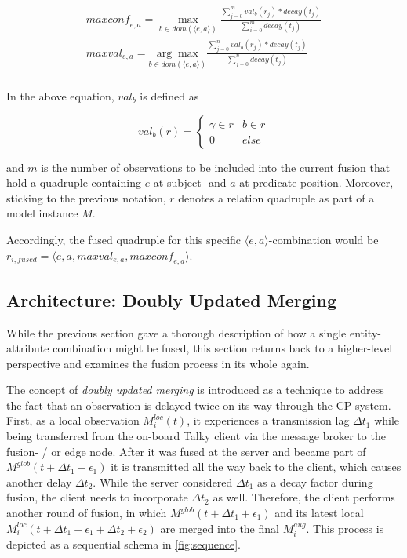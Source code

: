 \begin{gather*}
	\textit{maxconf}_{e,a} = \underset{b \in \textit{dom}(\langle e, a \rangle)}{\max} \frac{\sum_{j = 0}^{m} \textit{val}_b(r_j) * \textit{decay}(t_j)}{\sum_{i = 0}^{m} \textit{decay}(t_j)} \\\textit{maxval}_{e,a} = \underset{b \in \textit{dom}(\langle e, a \rangle)}{\arg\max} \frac{\sum_{j = 0}^{n} \textit{val}_b(r_j) * \textit{decay}(t_j)}{\sum_{j = 0}^{n} \textit{decay}(t_j)} \\
\end{gather*}

In the above equation, $\textit{val}_b$ is defined as

$$
\textit{val}_b(r) = 
	\begin{cases}
	\gamma \in r & b \in r \\
	0 & else
	\end{cases}
$$

and $m$ is the number of observations to be included into the current fusion that hold a quadruple containing $e$ at subject- and $a$ at predicate position. Moreover, sticking to the previous notation, $r$ denotes a relation quadruple as part of a model instance $M$.

Accordingly, the fused quadruple for this specific $\langle e, a \rangle$-combination would be $r_{i,fused} = \langle e, a, \textit{maxval}_{e,a}, \textit{maxconf}_{e,a} \rangle$.

\subsection{Architecture: Doubly Updated Merging}
\label{subsec:concept_design:fusion_architecture}

While the previous section gave a thorough description of how a single entity-attribute combination might be fused, this section returns back to a higher-level perspective and examines the fusion process in its whole again.

The concept of \textit{doubly updated merging} is introduced as a technique to address the fact that an observation is delayed twice on its way through the CP system. First, as a local observation $M^{loc}_i(t)$, it experiences a transmission lag $\Delta t_1$ while being transferred from the on-board Talky client via the message broker to the fusion- / or edge node. After it was fused at the server and became part of $M^{glob}(t+\Delta t_1+\epsilon_1)$ it is transmitted all the way back to the client, which causes another delay $\Delta t_2$. While the server considered $\Delta t_1$ as a decay factor during fusion, the client needs to incorporate $\Delta t_2$ as well. Therefore, the client performs another round of fusion, in which $M^{glob}(t+\Delta t_1+\epsilon_1)$ and its latest local $M^{loc}_i(t+\Delta t_1+\epsilon_1+\Delta t_2+\epsilon_2)$ are merged into the final $M^{aug}_i$. This process is depicted as a sequential schema in \cref{fig:sequence}.

